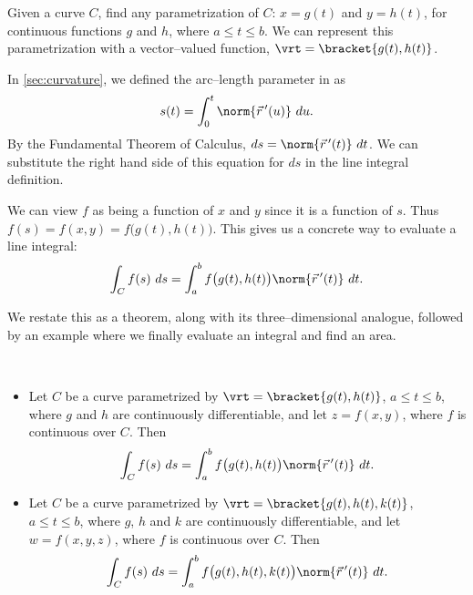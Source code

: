 
Given a curve $C$, find any parametrization of $C$: $x = g(t)$ and $y=h(t)$, for continuous functions $g$ and $h$, where $a\leq t\leq b$. We can represent this parametrization with a vector--valued function, $\vrt =\bracket{g(t),h(t)}$.

In \autoref{sec:curvature}, we defined the arc--length parameter in  as 
\[
s(t) = \int_0^t \norm{\vec r\,'(u)}\ du. 
\]
By the Fundamental Theorem of Calculus, $ds = \norm{\vec r\,'(t)}\ dt$. We can substitute the right hand side of this equation for $ds$ in the line integral definition.

We can view $f$ as being a function of $x$ and $y$ since it is a function of $s$. Thus $f(s) =f(x,y) =f\big(g(t),h(t)\big)$. This gives us a concrete way to evaluate a line integral:
\[\int_C f(s)\ ds = \int_a^bf\big(g(t),h(t)\big)\norm{\vec r\,'(t)}\ dt.\]

We restate this as a theorem, along with its three--dimensional analogue, followed by an example where we finally evaluate an integral and find an area.

{%
\mbox{}\\[-2\baselineskip]\begin{itemize}
	\item Let $C$ be a curve parametrized by $\vrt =\bracket{g(t),h(t)}$, $a\leq t\leq b$, where $g$ and $h$ are continuously differentiable, and let $z=f(x,y)$, where $f$ is continuous over $C$. Then
\[\int_Cf(s)\ ds = \int_a^bf\big(g(t),h(t)\big)\norm{\vec r\,'(t)}\ dt.\]
	\item Let $C$ be a curve parametrized by $\vrt =\bracket{g(t),h(t),k(t)}$, $a\leq t\leq b$, where $g$, $h$ and $k$ are continuously differentiable, and let $w=f(x,y,z)$, where $f$ is continuous over $C$. Then
\[\int_Cf(s)\ ds = \int_a^bf\big(g(t),h(t),k(t)\big)\norm{\vec r\,'(t)}\ dt.\]
\end{itemize}}


